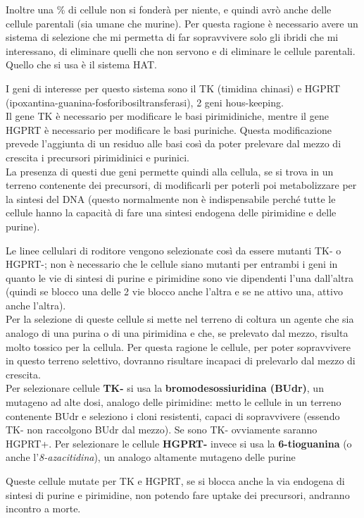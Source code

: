 \documentclass[11pt]{book}
\begin{document}
Inoltre una \% di cellule non si fonderà per niente, e quindi avrò anche delle cellule parentali (sia umane che murine). Per questa ragione è necessario avere un sistema di selezione che mi permetta di far sopravvivere solo gli ibridi che mi interessano, di eliminare quelli che non servono e di eliminare le cellule parentali. Quello che si usa è il sistema HAT.

I geni di interesse per questo sistema sono il TK (timidina chinasi) e HGPRT (ipoxantina-guanina-fosforibosiltransferasi), 2 geni hous-keeping.\\
Il gene TK è necessario per modificare le basi pirimidiniche, mentre il gene HGPRT è necessario per modificare le basi puriniche. Questa modificazione prevede l’aggiunta di un residuo alle basi così da poter prelevare dal mezzo di crescita i precursori pirimidinici e purinici.\\
La presenza di questi due geni permette quindi alla cellula, se si trova in un terreno contenente dei precursori, di modificarli per poterli poi metabolizzare per la sintesi del DNA (questo normalmente non è indispensabile perché tutte le cellule hanno la capacità di fare una sintesi endogena delle pirimidine e delle purine).

Le linee cellulari di roditore vengono selezionate così da essere mutanti TK- o HGPRT-; non è necessario che le cellule siano mutanti per entrambi i geni in quanto le vie di sintesi di purine e pirimidine sono vie dipendenti l’una dall’altra (quindi se blocco una delle 2 vie blocco anche l’altra e se ne attivo una, attivo anche l’altra).\\
Per la selezione di queste cellule si mette nel terreno di coltura un agente che sia analogo di una purina o di una pirimidina e che, se prelevato dal mezzo, risulta molto tossico per la cellula. Per questa ragione le cellule, per poter sopravvivere in questo terreno selettivo, dovranno risultare incapaci di prelevarlo dal mezzo di crescita.\\
Per selezionare cellule \textbf{TK-} si usa la \textbf{bromodesossiuridina (BUdr)}, un mutageno ad alte dosi, analogo delle pirimidine: metto le cellule in un terreno contenente BUdr e seleziono i cloni resistenti, capaci di sopravvivere (essendo TK- non raccolgono BUdr dal mezzo). Se sono TK- ovviamente saranno HGPRT+.
Per selezionare le cellule \textbf{HGPRT-} invece si usa la \textbf{6-tioguanina} (o anche l’\emph{8-azacitidina}), un analogo altamente mutageno delle purine

Queste cellule mutate per TK e HGPRT, se si blocca anche la via endogena di sintesi di purine e pirimidine, non potendo fare uptake dei precursori, andranno incontro a morte.
\end{document}
